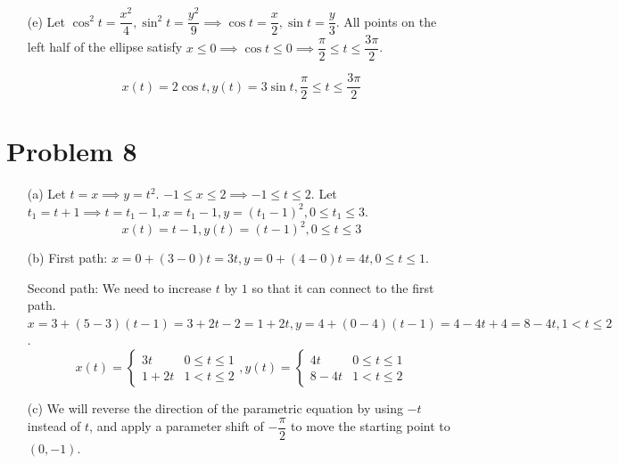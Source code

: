 \documentclass{article}
\begin{document}
\begin{itemize}
\item[(e)]
	Let $\cos^2t=\dfrac{x^2}{4},\sin^2t=\dfrac{y^2}{9}\implies\cos t=\dfrac{x}{2},\sin t=\dfrac{y}{3}$. All points on the left half of the ellipse satisfy $x\leq0\implies\cos t\leq0\implies\dfrac{\pi}{2}\leq t\leq\dfrac{3\pi}{2}$.

	\begin{equation*}
		\boxed{x(t)=2\cos t,y(t)=3\sin t,\frac{\pi}{2}\leq t\leq\frac{3\pi}{2}}
	\end{equation*}

\end{itemize}

\section*{Problem 8}
\begin{itemize}
\item[(a)]
	Let $t=x\implies y=t^2$. $-1\leq x\leq 2\implies-1\leq t\leq 2$. Let $t_1=t+1\implies t=t_1-1,x=t_1-1,y=(t_1-1)^2,0\leq t_1\leq3$.
	\begin{equation*}
		\boxed{x(t)=t-1,y(t)=(t-1)^2,0\leq t\leq3}
	\end{equation*}

\item[(b)]
	First path: $x=0+(3-0)t=3t,y=0+(4-0)t=4t,0\leq t\leq1$.

	Second path: We need to increase $t$ by $1$ so that it can connect to the first path. \\ $x=3+(5-3)(t-1)=3+2t-2=1+2t,y=4+(0-4)(t-1)=4-4t+4=8-4t,1<t\leq2$.
	\begin{equation*}
		\boxed{x(t)=\begin{cases}
			3t & 0\leq t\leq1 \\
			1+2t & 1<t\leq2
		\end{cases},
		y(t)=\begin{cases}
			4t & 0\leq t\leq1 \\
			8-4t & 1<t\leq2
		\end{cases}}
	\end{equation*}

\item[(c)]
	We will reverse the direction of the parametric equation by using $-t$ instead of $t$, and apply a parameter shift of $-\dfrac{\pi}{2}$ to move the starting point to $(0,-1)$.


\end{itemize}
\end{document}
